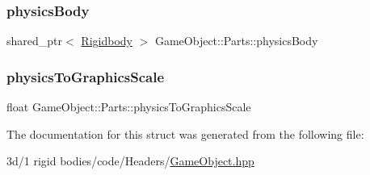 \subsubsection{\texorpdfstring{physics\+Body}{physicsBody}}
{\footnotesize\ttfamily shared\+\_\+ptr$<$ \mbox{\hyperlink{class_rigidbody}{Rigidbody}} $>$ Game\+Object\+::\+Parts\+::physics\+Body}

\mbox{\label{struct_game_object_1_1_parts_a898129420b23efe2ed98f1e63a21c1e9}} 
\subsubsection{\texorpdfstring{physics\+To\+Graphics\+Scale}{physicsToGraphicsScale}}
{\footnotesize\ttfamily float Game\+Object\+::\+Parts\+::physics\+To\+Graphics\+Scale}



The documentation for this struct was generated from the following file\+:\begin{DoxyCompactItemize}
\item 
3d/1 rigid bodies/code/\+Headers/\mbox{\hyperlink{_game_object_8hpp}{Game\+Object.\+hpp}}\end{DoxyCompactItemize}
